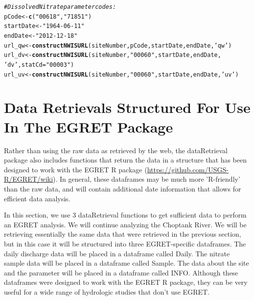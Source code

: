 \documentclass[a4paper,11pt]{article}\usepackage[]{graphicx}\usepackage[]{color}
\makeatletter
\newcommand{\hlstr}[1]{\textcolor[rgb]{0.192,0.494,0.8}{#1}}%
\newcommand{\hlcom}[1]{\textcolor[rgb]{0.678,0.584,0.686}{\textit{#1}}}%
\newcommand{\hlstd}[1]{\textcolor[rgb]{0.345,0.345,0.345}{#1}}%
\newcommand{\hlkwb}[1]{\textcolor[rgb]{0.69,0.353,0.396}{#1}}%
\newcommand{\hlkwc}[1]{\textcolor[rgb]{0.333,0.667,0.333}{#1}}%
\newcommand{\hlkwd}[1]{\textcolor[rgb]{0.737,0.353,0.396}{\textbf{#1}}}%
\newenvironment{kframe}{%
 \def\at@end@of@kframe{}%
 \ifinner\ifhmode%
  \def\at@end@of@kframe{\end{minipage}}%
  \begin{minipage}{\columnwidth}%
 \fi\fi%
 \def\FrameCommand##1{\hskip\@totalleftmargin \hskip-\fboxsep
 \colorbox{shadecolor}{##1}\hskip-\fboxsep
     \hskip-\linewidth \hskip-\@totalleftmargin \hskip\columnwidth}%
 \MakeFramed {\advance\hsize-\width
   \@totalleftmargin\z@ \linewidth\hsize
   \@setminipage}}%
 {\par\unskip\endMakeFramed%
 \at@end@of@kframe}
\newenvironment{knitrout}{}{} %
\makeatother
\begin{document}
\begin{knitrout}
\color{fgcolor}\begin{kframe}
\begin{alltt}
\hlcom{# Dissolved Nitrate parameter codes:}
\hlstd{pCode} \hlkwb{<-} \hlkwd{c}\hlstd{(}\hlstr{"00618"}\hlstd{,}\hlstr{"71851"}\hlstd{)}
\hlstd{startDate} \hlkwb{<-} \hlstr{"1964-06-11"}
\hlstd{endDate} \hlkwb{<-} \hlstr{"2012-12-18"}
\hlstd{url_qw} \hlkwb{<-} \hlkwd{constructNWISURL}\hlstd{(siteNumber,pCode,startDate,endDate,}\hlstr{'qw'}\hlstd{)}
\hlstd{url_dv} \hlkwb{<-} \hlkwd{constructNWISURL}\hlstd{(siteNumber,}\hlstr{"00060"}\hlstd{,startDate,endDate,}
                           \hlstr{'dv'}\hlstd{,}\hlkwc{statCd}\hlstd{=}\hlstr{"00003"}\hlstd{)}
\hlstd{url_uv} \hlkwb{<-} \hlkwd{constructNWISURL}\hlstd{(siteNumber,}\hlstr{"00060"}\hlstd{,startDate,endDate,}\hlstr{'uv'}\hlstd{)}
\end{alltt}
\end{kframe}
\end{knitrout}


\FloatBarrier

\section{Data Retrievals Structured For Use In The EGRET Package}
Rather than using the raw data as retrieved by the web, the dataRetrieval package also includes functions that return the data in a structure that has been designed to work with the EGRET R package (\url{https://github.com/USGS-R/EGRET/wiki}). In general, these dataframes may be much more 'R-friendly' than the raw data, and will contain additional date information that allows for efficient data analysis.

In this section, we use 3 dataRetrieval functions to get sufficient data to perform an EGRET analysis.  We will continue analyzing the Choptank River. We will be retrieving essentially the same data that were retrieved in the previous section, but in this case it will be structured into three EGRET-specific dataframes.  The daily discharge data will be placed in a dataframe called Daily.  The nitrate sample data will be placed in a dataframe called Sample.  The data about the site and the parameter will be placed in a dataframe called INFO.  Although these dataframes were designed to work with the EGRET R package, they can be very useful for a wide range of hydrologic studies that don't use EGRET.
\end{document}
